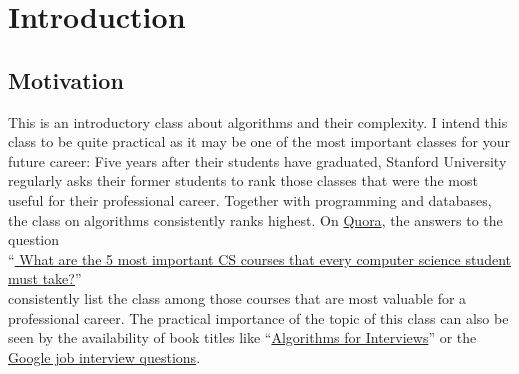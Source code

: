 \chapter{Introduction}
\section{Motivation}
This is an introductory class about algorithms and their complexity.
I intend this class to be quite practical as it may be one of the most important classes for your future
career: Five years after their students have graduated, Stanford University 
regularly asks their former students to rank those classes that were the most useful for their professional
career.  Together with programming and databases, the class on algorithms consistently ranks highest.
On \href{https://quora.com}{Quora}, the answers to the question
\\[0.1cm]
\hspace*{0.8cm}
``\href{https://www.quora.com/What-are-the-5-most-important-CS-courses-that-every-computer-science-student-must-take}{
  What are the 5 most important CS courses that every computer science student must take?}''
\\[0.1cm]
consistently list the class  among those courses that are most valuable
for a professional career.  The practical importance of the topic of this class can also be seen by the
availability of book titles like
``\href{https://www.amazon.com/Algorithms-Interviews-Adnan-Aziz/dp/1453792996}{Algorithms for Interviews}''  
\cite{aziz:10} or the \href{http://www.youtube.com/watch?v=k4RRi_ntQc8}{Google job interview questions}.
 
 

